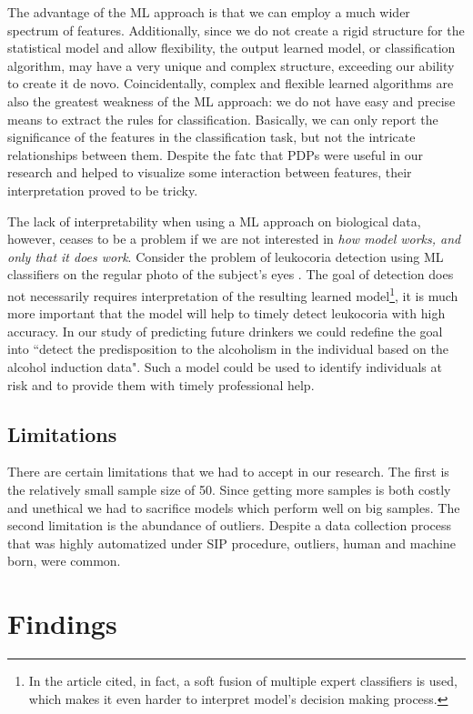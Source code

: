 The advantage of the ML approach is that we can employ a much wider spectrum of features. Additionally, since we do not create a rigid structure for the statistical model and allow flexibility, the output learned model, or classification algorithm, may have a very unique and complex structure, exceeding our ability to create it de novo. Coincidentally, complex and flexible learned algorithms are also the greatest weakness of the ML approach: we do not have easy and precise means to extract the rules for classification. Basically, we can only report the significance of the features in the classification task, but not the intricate relationships between them. Despite the fatc that PDPs were useful in our research and helped to visualize some interaction between features, their interpretation proved to be tricky. 

The lack of interpretability when using a ML approach on biological data, however, ceases to be a problem if we are not interested in \textit{how model works, and only that it does work}. Consider the problem of leukocoria detection using ML classifiers on the regular photo of the subject's eyes . The goal of detection does not necessarily requires interpretation of the resulting learned model\footnote{In the article cited, in fact, a soft fusion of multiple expert classifiers is used, which makes it even harder to interpret model's decision making process.}, it is much more important that the model will help to timely detect leukocoria with high accuracy. In our study of predicting future drinkers we could redefine the goal into ``detect the predisposition to the alcoholism in the individual based on the alcohol induction data". Such a model could be used to identify individuals at risk and to provide them with timely professional help. 

\subsection{Limitations}
There are certain limitations that we had to accept in our research. The first is the relatively small sample size of 50. Since getting more samples is both costly and unethical we had to sacrifice models which perform well on big samples. The second limitation is the abundance of outliers. Despite a data collection process that was highly automatized under SIP procedure, outliers, human and machine born, were common.


\section{Findings}

